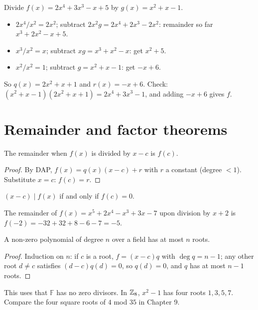 \begin{example}
Divide $f(x) = 2x^4 + 3x^3 - x + 5$ by $g(x) = x^2 + x - 1$.
\begin{itemize}
  \item $2x^4 / x^2 = 2x^2$; subtract $2x^2 g = 2x^4 + 2x^3 - 2x^2$: remainder so far
        $x^3 + 2x^2 - x + 5$.
  \item $x^3 / x^2 = x$; subtract $xg = x^3 + x^2 - x$: get $x^2 + 5$.
  \item $x^2 / x^2 = 1$; subtract $g = x^2 + x - 1$: get $-x + 6$.
\end{itemize}
So $q(x) = 2x^2 + x + 1$ and $r(x) = -x + 6$. Check:
$(x^2 + x - 1)(2x^2 + x + 1) = 2x^4 + 3x^3 - 1$, and adding $-x + 6$ gives $f$.
\end{example}

\section{Remainder and factor theorems}

\begin{theorem}
The remainder when $f(x)$ is divided by $x - c$ is $f(c)$.
\end{theorem}
\begin{proof}
By DAP, $f(x) = q(x)(x - c) + r$ with $r$ a constant (degree $< 1$). Substitute $x = c$:
$f(c) = r$.
\end{proof}

\begin{theorem}
$(x - c) \mid f(x)$ if and only if $f(c) = 0$.
\end{theorem}

\begin{example}
The remainder of $f(x) = x^5 + 2x^4 - x^3 + 3x - 7$ upon division by $x + 2$ is
$f(-2) = -32 + 32 + 8 - 6 - 7 = -5$.
\end{example}

\begin{corollary}
A non-zero polynomial of degree $n$ over a field has at most $n$ roots.
\end{corollary}
\begin{proof}
Induction on $n$: if $c$ is a root, $f = (x-c)q$ with $\deg q = n - 1$; any other root $d \ne c$
satisfies $(d - c)q(d) = 0$, so $q(d) = 0$, and $q$ has at most $n - 1$ roots.
\end{proof}

\begin{aside}
This uses that $\mathbb F$ has no zero divisors. In $\mathbb{Z}_{8}$, $x^2 - 1$ has four roots
$1,3,5,7$. Compare the four square roots of $4$ mod $35$ in Chapter 9.
\end{aside}

